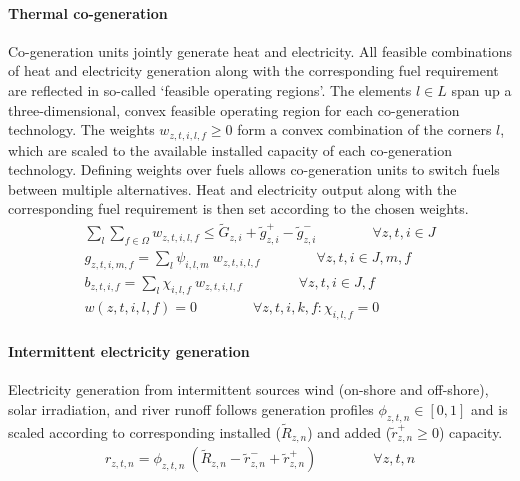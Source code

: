 \documentclass[review, 3p, times, 12pt, authoryear]{elsarticle}
\begin{document}
    \paragraph{Thermal co-generation}
    Co-generation units jointly generate heat and electricity. All feasible combinations of heat and electricity
    generation along with the corresponding fuel requirement are reflected in so-called `feasible operating regions'.
    The elements $l \in L$ span up a three-dimensional, convex feasible operating region for each co-generation technology.
    The weights $w_{z,t,i,l,f} \geq 0$ form a convex combination of the corners $l$, which are scaled to the available
    installed capacity of each co-generation technology.
    Defining weights over fuels allows co-generation units to switch fuels between multiple alternatives.
    Heat and electricity output along with the corresponding fuel requirement is then set according to the chosen weights.
    \begin{align}
        \sum_{l}\sum_{f \in \Omega} w_{z,t,i,l,f} \leq \widetilde{G}_{z,i} +\widetilde{g}^{+}_{z,i} -\widetilde{g}^{-}_{z,i}\qquad \qquad \forall z,t,i \in J\\
        g_{z,t,i,m,f} =\sum_{l}\psi_{i,l,m}\:w_{z,t,i,l,f}\qquad \qquad \forall z,t,i \in J, m, f\\
        b_{z,t,i,f} =\sum_{l}\chi_{i,l,f}\:w_{z,t,i,l,f}\qquad \qquad \forall z,t,i \in J, f\\
        w(z,t,i,l,f) = 0\qquad \qquad \forall z,t,i,k,f:\chi_{i,l,f} = 0
    \end{align}

    \paragraph{Intermittent electricity generation}
    Electricity generation from intermittent sources wind (on-shore and off-shore), solar irradiation, and river runoff
    follows generation profiles $\phi_{z,t,n} \in [0,1]$ and is scaled according to corresponding installed
    ($ \widetilde{R}_{z,n}$) and added ($\widetilde{r}^{+}_{z,n} \geq 0$) capacity.
    \begin{align}
        r_{z,t,n} = \phi_{z,t,n}\: \left( \widetilde{R}_{z,n} -\widetilde{r}^{-}_{z,n} +\widetilde{r}^{+}_{z,n}\right)\qquad \qquad \forall z,t,n
    \end{align}
\end{document}
